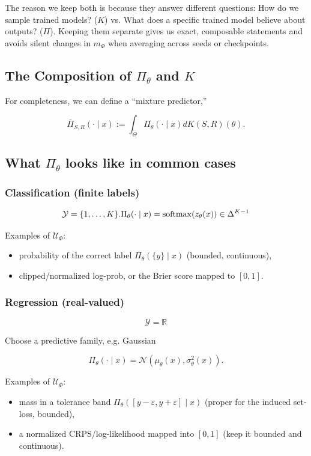 \documentclass[12pt]{article}
\begin{document}
The reason we keep both is because they answer different questions: How do we sample trained models? ($K$) vs. What does a specific trained model believe about outputs? ($\Pi$). Keeping them separate gives us exact, composable statements and avoids silent changes in $m_\Phi$ when averaging across seeds or checkpoints.

\subsection{The Composition of $\Pi_\theta$ and $K$}

For completeness, we can define a “mixture predictor,”

\[
\bar \Pi _{S,R}(\cdot \mid x):= \int _\Theta \Pi_\theta(\cdot \mid x)dK(S,R)(\theta).
\]

\subsection{What $\Pi_\theta$ looks like in common cases}

\subsubsection{Classification (finite labels)}
\[
\mathcal Y=\{1,\dots,K\} . \\
\Pi_\theta(\cdot\mid x)=\mathrm{softmax}(z_\theta(x))\in\Delta^{K-1}
\]

Examples of $\mathcal U_\Phi$:
\begin{itemize}
    \item probability of the correct label $\Pi_\theta(\{y\}\mid x)$ (bounded, continuous),
    \item clipped/normalized log-prob, or the Brier score mapped to $[0,1]$.
\end{itemize}

\subsubsection{Regression (real-valued)}

\[
\mathcal Y=\mathbb R
\]

Choose a predictive family, e.g. Gaussian

\[
\Pi_\theta(\cdot\mid x)=\mathcal N(\mu_\theta(x),\sigma^2_\theta(x)).
\]

Examples of $\mathcal U_\Phi$:
\begin{itemize}
    \item mass in a tolerance band $\Pi_\theta([y-\varepsilon,y+\varepsilon]\mid x)$ (proper for the induced set-loss, bounded),
    \item a normalized CRPS/log-likelihood mapped into $[0,1]$ (keep it bounded and continuous).
\end{itemize}
\end{document}
